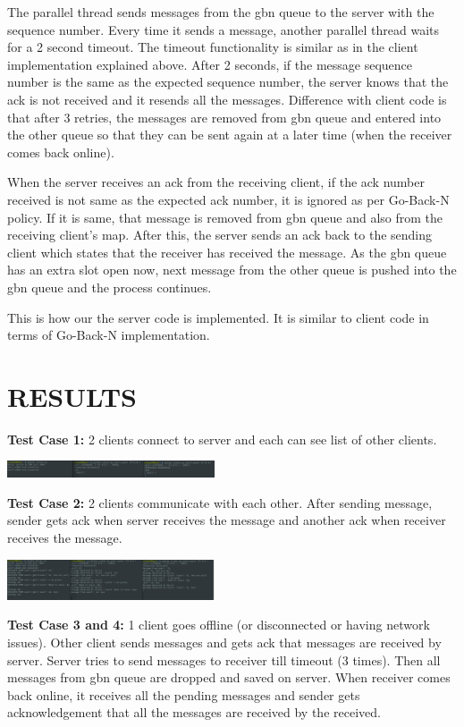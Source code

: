 \documentclass[10pt, pdftex, twocolumn]{report}
\begin{document}
	The parallel thread sends messages from the gbn queue to the server with the sequence number. Every time it sends a message, another parallel thread waits for a 2 second timeout. The timeout functionality is similar as in the client implementation explained above. After 2 seconds, if the message sequence number is the same as the expected sequence number, the server knows that the ack is not received and it resends all the messages. Difference with client code is that after 3 retries, the messages are removed from gbn queue and entered into the other queue so that they can be sent again at a later time (when the receiver comes back online).
	
	When the server receives an ack from the receiving client, if the ack number received is not same as the expected ack number, it is ignored as per Go-Back-N policy. If it is same, that message is removed from gbn queue and also from the receiving client’s map. After this, the server sends an ack back to the sending client which states that the receiver has received the message. As the gbn queue has an extra slot open now, next message from the other queue is pushed into the gbn queue and the process continues.
	
	This is how our the server code is implemented. It is similar to client code in terms of Go-Back-N implementation.
	
	
	
	\section*{RESULTS}
	\textbf{Test Case 1:} 2 clients connect to server and each can see list of other clients.
	
	\includegraphics*[width=0.46\textwidth]{list.png}
	
	\textbf{Test Case 2:} 2 clients communicate with each other. After sending message, sender gets ack when server receives the message and another ack when receiver receives the message.
	
	\includegraphics*[width=0.46\textwidth]{comm.png}
	
	\textbf{Test Case 3 and 4:} 1 client goes offline (or disconnected or having network issues). Other client sends messages and gets ack that messages are received by server. Server tries to send messages to receiver till timeout (3 times). Then all messages from gbn queue are dropped and saved on server. When receiver comes back online, it receives all the pending messages and sender gets acknowledgement that all the messages are received by the received.
	
\end{document}
